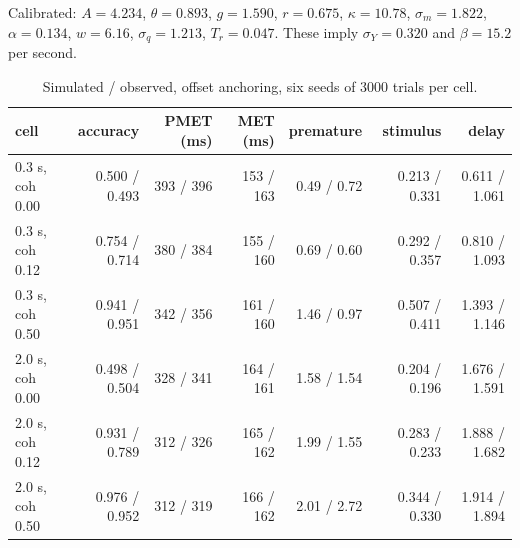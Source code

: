 \documentclass[11pt,a4paper]{article}
\theoremstyle{plain}
\theoremstyle{remark}
\begin{document}
Calibrated: $A=4.234$, $\theta=0.893$, $g=1.590$, $r=0.675$, $\kappa=10.78$,
$\sigma_m=1.822$, $\alpha=0.134$, $w=6.16$, $\sigma_q=1.213$, $T_r=0.047$. These imply
$\sigma_Y=0.320$ and $\beta=15.2$ per second.

\begin{table}[htbp]
\centering
\caption{Simulated / observed, offset anchoring, six seeds of 3000 trials per cell.}
\begin{tabular}{lrrrrrr}
\toprule
cell & accuracy & PMET (ms) & MET (ms) & premature & stimulus & delay\\
\midrule
0.3 s, coh 0.00 & 0.500 / 0.493 & 393 / 396 & 153 / 163 & 0.49 / 0.72 & 0.213 / 0.331 & 0.611 / 1.061\\
0.3 s, coh 0.12 & 0.754 / 0.714 & 380 / 384 & 155 / 160 & 0.69 / 0.60 & 0.292 / 0.357 & 0.810 / 1.093\\
0.3 s, coh 0.50 & 0.941 / 0.951 & 342 / 356 & 161 / 160 & 1.46 / 0.97 & 0.507 / 0.411 & 1.393 / 1.146\\
2.0 s, coh 0.00 & 0.498 / 0.504 & 328 / 341 & 164 / 161 & 1.58 / 1.54 & 0.204 / 0.196 & 1.676 / 1.591\\
2.0 s, coh 0.12 & 0.931 / 0.789 & 312 / 326 & 165 / 162 & 1.99 / 1.55 & 0.283 / 0.233 & 1.888 / 1.682\\
2.0 s, coh 0.50 & 0.976 / 0.952 & 312 / 319 & 166 / 162 & 2.01 / 2.72 & 0.344 / 0.330 & 1.914 / 1.894\\
\bottomrule
\end{tabular}
\end{table}
\end{document}
